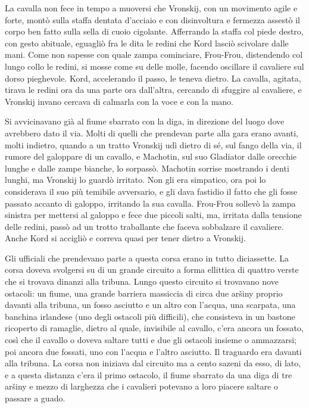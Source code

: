 La cavalla non fece in tempo a muoversi che Vronskij, con un movimento agile e forte, montò sulla staffa dentata d'acciaio e con disinvoltura e fermezza assestò il corpo ben fatto sulla sella di cuoio cigolante. Afferrando la staffa col piede destro, con gesto abituale, eguagliò fra le dita le redini che Kord lasciò scivolare dalle mani. Come non sapesse con quale zampa cominciare, Frou-Frou, distendendo col lungo collo le redini, si mosse come su delle molle, facendo oscillare il cavaliere sul dorso pieghevole. Kord, accelerando il passo, le teneva dietro. La cavalla, agitata, tirava le redini ora da una parte ora dall'altra, cercando di sfuggire al cavaliere, e Vronskij invano cercava di calmarla con la voce e con la mano. 

Si avvicinavano già al fiume sbarrato con la diga, in direzione del luogo dove avrebbero dato il via. Molti di quelli che prendevan parte alla gara erano avanti, molti indietro, quando a un tratto Vronskij udì dietro di sé, sul fango della via, il rumore del galoppare di un cavallo, e Machotin, sul suo Gladiator dalle orecchie lunghe e dalle zampe bianche, lo sorpassò. Machotin sorrise mostrando i denti lunghi, ma Vronskij lo guardò irritato. Non gli era simpatico, ora poi lo considerava il suo più temibile avversario, e gli dava fastidio il fatto che gli fosse passato accanto di galoppo, irritando la sua cavalla. Frou-Frou sollevò la zampa sinistra per mettersi al galoppo e fece due piccoli salti, ma, irritata dalla tensione delle redini, passò ad un trotto traballante che faceva sobbalzare il cavaliere. Anche Kord si accigliò e correva quasi per tener dietro a Vronskij. 

\label{xxv-1} 

Gli ufficiali che prendevano parte a questa corsa erano in tutto diciassette. La corsa doveva svolgersi su di un grande circuito a forma ellittica di quattro verste che si trovava dinanzi alla tribuna. Lungo questo circuito si trovavano nove ostacoli: un fiume, una grande barriera massiccia di circa due aršiny proprio davanti alla tribuna, un fosso asciutto e un altro con l'acqua, una scarpata, una banchina irlandese (uno degli ostacoli più difficili), che consisteva in un bastone ricoperto di ramaglie, dietro al quale, invisibile al cavallo, c'era ancora un fossato, così che il cavallo o doveva saltare tutti e due gli ostacoli insieme o ammazzarsi; poi ancora due fossati, uno con l'acqua e l'altro asciutto. Il traguardo era davanti alla tribuna. La corsa non iniziava dal circuito ma a cento sazeni da esso, di lato, e a questa distanza c'era il primo ostacolo, il fiume sbarrato da una diga di tre aršiny e mezzo di larghezza che i cavalieri potevano a loro piacere saltare o passare a guado. 

